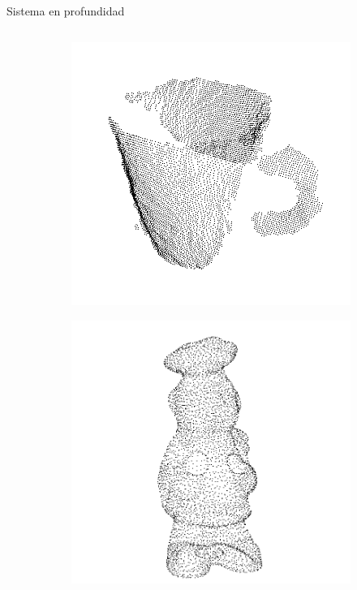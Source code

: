 \documentclass[]{beamer}
\begin{document}
\begin{frame}[fragile]{Sistema en profundidad}
\begin{columns}
\begin{column}{5cm}
{\begin{center}
                \end{center}
                \vspace{-20pt}
                \begin{figure}
                	\begin{subfigure}[b]{\textwidth}
                        \centering
                		\includegraphics[scale=0.1]{img/nubes/taza_02.png}
                	\end{subfigure}
                	\quad
                	\begin{subfigure}[b]{\textwidth}
                        \centering
                		\includegraphics[scale=0.1]{img/nubes/chef_01.png}

\end{subfigure}
\end{figure}}
\end{column}
\end{columns}
\end{frame}
\end{document}
